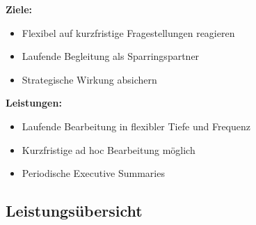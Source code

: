 \documentclass[11pt,a4paper]{article}
\begin{document}
\textbf{Ziele:}
\begin{itemize}
    \item[$\checkmark$] Flexibel auf kurzfristige Fragestellungen reagieren
    \item[$\checkmark$] Laufende Begleitung als Sparringspartner
    \item[$\checkmark$] Strategische Wirkung absichern
\end{itemize}

\textbf{Leistungen:}
\begin{itemize}
    \item Laufende Bearbeitung in flexibler Tiefe und Frequenz
    \item Kurzfristige ad hoc Bearbeitung möglich
    \item Periodische Executive Summaries
\end{itemize}

\vspace{0.3cm}
\begin{center}
\end{center}

\newpage
\subsection{Leistungsübersicht}
\end{document}
